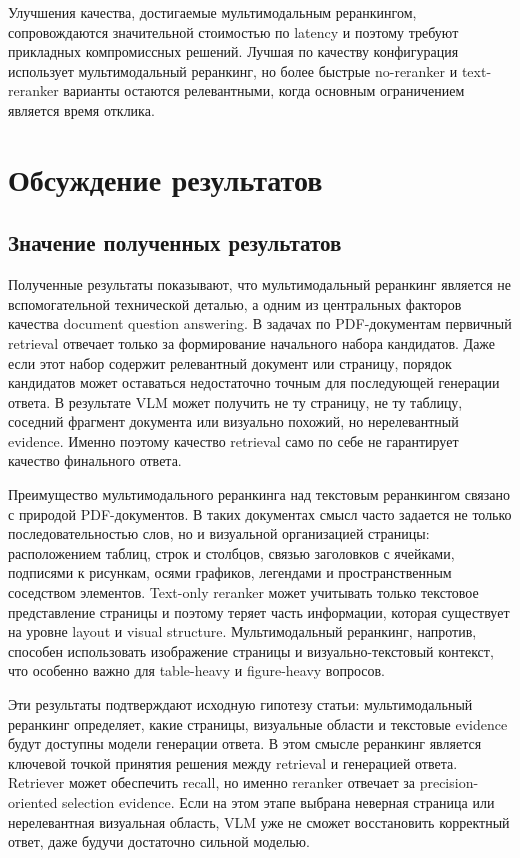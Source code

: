 \documentclass[conference]{IEEEtran}
\begin{document}
Улучшения качества, достигаемые мультимодальным реранкингом, сопровождаются значительной стоимостью по latency и поэтому требуют прикладных компромиссных решений. Лучшая по качеству конфигурация использует мультимодальный реранкинг, но более быстрые no-reranker и text-reranker варианты остаются релевантными, когда основным ограничением является время отклика.


\section{Обсуждение результатов}

\subsection{Значение полученных результатов}

Полученные результаты показывают, что мультимодальный реранкинг является не вспомогательной технической деталью, а одним из центральных факторов качества document question answering. В задачах по PDF-документам первичный retrieval отвечает только за формирование начального набора кандидатов. Даже если этот набор содержит релевантный документ или страницу, порядок кандидатов может оставаться недостаточно точным для последующей генерации ответа. В результате VLM может получить не ту страницу, не ту таблицу, соседний фрагмент документа или визуально похожий, но нерелевантный evidence. Именно поэтому качество retrieval само по себе не гарантирует качество финального ответа.

Преимущество мультимодального реранкинга над текстовым реранкингом связано с природой PDF-документов. В таких документах смысл часто задается не только последовательностью слов, но и визуальной организацией страницы: расположением таблиц, строк и столбцов, связью заголовков с ячейками, подписями к рисункам, осями графиков, легендами и пространственным соседством элементов. Text-only reranker может учитывать только текстовое представление страницы и поэтому теряет часть информации, которая существует на уровне layout и visual structure. Мультимодальный реранкинг, напротив, способен использовать изображение страницы и визуально-текстовый контекст, что особенно важно для table-heavy и figure-heavy вопросов.

Эти результаты подтверждают исходную гипотезу статьи: мультимодальный реранкинг определяет, какие страницы, визуальные области и текстовые evidence будут доступны модели генерации ответа. В этом смысле реранкинг является ключевой точкой принятия решения между retrieval и генерацией ответа. Retriever может обеспечить recall, но именно reranker отвечает за precision-oriented selection evidence. Если на этом этапе выбрана неверная страница или нерелевантная визуальная область, VLM уже не сможет восстановить корректный ответ, даже будучи достаточно сильной моделью.
\end{document}
